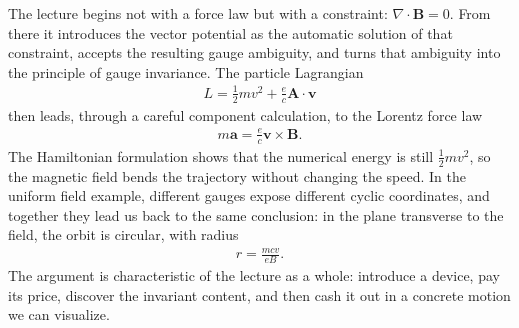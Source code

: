 The lecture begins not with a force law but with a constraint: \(\nabla\!\cdot\!\mathbf B=0\). From there it introduces the vector potential as the automatic solution of that constraint, accepts the resulting gauge ambiguity, and turns that ambiguity into the principle of gauge invariance. The particle Lagrangian
\begin{align}
L=\frac{1}{2}mv^2+\frac{e}{c}\mathbf A\cdot \mathbf v
\end{align}
then leads, through a careful component calculation, to the Lorentz force law
\begin{align}
m\mathbf a=\frac{e}{c}\mathbf v\times\mathbf B.
\end{align}
The Hamiltonian formulation shows that the numerical energy is still \(\frac{1}{2}mv^2\), so the magnetic field bends the trajectory without changing the speed. In the uniform field example, different gauges expose different cyclic coordinates, and together they lead us back to the same conclusion: in the plane transverse to the field, the orbit is circular, with radius
\begin{align}
r=\frac{mcv}{eB}.
\end{align}
The argument is characteristic of the lecture as a whole: introduce a device, pay its price, discover the invariant content, and then cash it out in a concrete motion we can visualize.